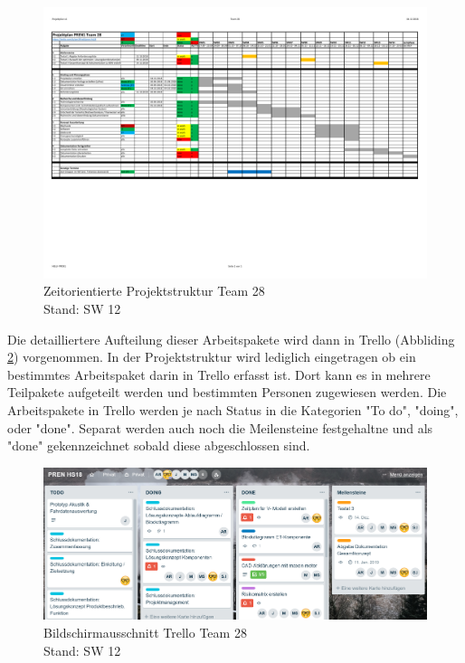 \documentclass[../../main.tex]{subfiles}
\begin{document}
\begin{figure}[H] \centering
    \includegraphics[page=1,width=1\textwidth, trim=.6cm 7cm .6cm 1.5cm, clip]{Projektplanung.pdf}
    \caption{Zeitorientierte Projektstruktur Team 28\\Stand: SW 12}
    \label{fig:projektplanung}
\end{figure}

Die detailliertere Aufteilung dieser Arbeitspakete wird dann in Trello (Abbliding \ref{fig:screenTrello}) vorgenommen. In der Projektstruktur wird lediglich eingetragen ob ein bestimmtes Arbeitspaket darin in Trello erfasst ist. Dort kann es in mehrere Teilpakete aufgeteilt werden und bestimmten Personen zugewiesen werden. Die Arbeitspakete in Trello werden je nach Status in die Kategorien "To do", "doing", oder "done". Separat werden auch noch die Meilensteine festgehaltne und als "done" gekennzeichnet sobald diese abgeschlossen sind.\\

\begin{figure}[H] \centering
    \includegraphics[page=1,width=.8\textwidth]{screenTrello.png}
    \caption{Bildschirmausschnitt Trello Team 28\\Stand: SW 12}
    \label{fig:screenTrello}
\end{figure}
\end{document}
